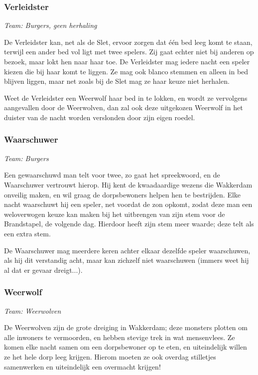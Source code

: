 \documentclass[12pt]{article}
\begin{document}
    \subsubsection{Verleidster}
      \emph{\scriptsize Team: Burgers, geen herhaling}
    
      De Verleidster kan, net als de Slet, ervoor zorgen dat \'e\'en bed leeg komt te staan, terwijl een ander bed vol ligt met twee spelers. Zij gaat echter niet bij anderen op bezoek, maar lokt hen naar haar toe. De Verleidster mag iedere nacht een speler kiezen die bij haar komt te liggen. Ze mag ook blanco stemmen en alleen in bed blijven liggen, maar net zoals bij de Slet mag ze haar keuze niet herhalen.
    
      Weet de Verleidster een Weerwolf haar bed in te lokken, en wordt ze vervolgens aangevallen door de Weerwolven, dan zal ook deze uitgekozen Weerwolf in het duister van de nacht worden verslonden door zijn eigen roedel.
    
    \subsubsection{Waarschuwer}
      \emph{\scriptsize Team: Burgers}
    
      Een gewaarschuwd man telt voor twee, zo gaat het spreekwoord, en de Waarschuwer vertrouwt hierop. Hij kent de kwaadaardige wezens die Wakkerdam onveilig maken, en wil graag de dorpsbewoners helpen hen te bestrijden. Elke nacht waarschuwt hij een speler, net voordat de zon opkomt, zodat deze man een weloverwogen keuze kan maken bij het uitbrengen van zijn stem voor de Brandstapel, de volgende dag. Hierdoor heeft zijn stem meer waarde; deze telt als een extra stem.
    
      De Waarschuwer mag meerdere keren achter elkaar dezelfde speler waarschuwen, als hij dit verstandig acht, maar kan zichzelf niet waarschuwen (immers weet hij al dat er gevaar dreigt...).
    
    \subsubsection{Weerwolf}
      \emph{\scriptsize Team: Weerwolven}
    
      De Weerwolven zijn de grote dreiging in Wakkerdam; deze monsters plotten om alle inwoners te vermoorden, en hebben stevige trek in wat mensenvlees. Ze komen elke nacht samen om een dorpsbewoner op te eten, en uiteindelijk willen ze het hele dorp leeg krijgen. Hierom moeten ze ook overdag stilletjes  samenwerken en uiteindelijk een overmacht krijgen!
    
\end{document}
